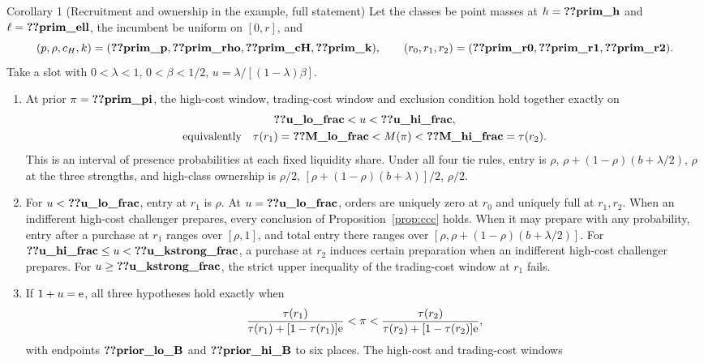 \begin{named}{Corollary 1 (Recruitment and ownership in the example, full statement)}
Let the classes be point masses at \(h=\reg{prim_h}\) and \(\ell=\reg{prim_ell}\), the incumbent be uniform on
\([0,r]\), and
\[
(p,\rho,c_H,k)=(\reg{prim_p},\reg{prim_rho},\reg{prim_cH},\reg{prim_k}),\qquad
(r_0,r_1,r_2)=(\reg{prim_r0},\reg{prim_r1},\reg{prim_r2}).
\]
Take a slot with \(0<\lambda<1\), \(0<\beta<1/2\), \(u=\lambda/[(1-\lambda)\beta]\).
\begin{enumerate}[label=(\alph*),leftmargin=2em]
\item At prior \(\pi=\reg{prim_pi}\), the high-cost window, trading-cost window and exclusion condition hold
together exactly on
\[
\begin{gathered}
\reg{u_lo_frac}<u<\reg{u_hi_frac},\\
\text{equivalently}\quad
\tau(r_1)=\reg{M_lo_frac}<M(\pi)<\reg{M_hi_frac}=\tau(r_2).
\end{gathered}
\]
This is an interval of presence probabilities at each fixed liquidity share. Under all four tie rules, entry is
\(\rho\), \(\rho+(1-\rho)(b+\lambda/2)\), \(\rho\) at the three strengths, and high-class ownership is
\(\rho/2\), \([\rho+(1-\rho)(b+\lambda)]/2\), \(\rho/2\).
\item For \(u<\reg{u_lo_frac}\), entry at \(r_1\) is \(\rho\). At \(u=\reg{u_lo_frac}\), orders are uniquely zero
at \(r_0\) and uniquely full at \(r_1,r_2\). When an indifferent high-cost challenger prepares, every conclusion
of Proposition~\ref{prop:ccc} holds. When it may prepare with any probability, entry after a purchase at \(r_1\)
ranges over \([\rho,1]\), and total entry there ranges over
\([\rho,\rho+(1-\rho)(b+\lambda/2)]\). For
\(\reg{u_hi_frac}\le u<\reg{u_kstrong_frac}\), a purchase at \(r_2\) induces certain preparation when an
indifferent high-cost challenger prepares. For \(u\ge\reg{u_kstrong_frac}\), the strict upper inequality of the
trading-cost window at \(r_1\) fails.
\item If \(1+u=\mathrm{e}\), all three hypotheses hold exactly when
\[
\frac{\tau(r_1)}{\tau(r_1)+[1-\tau(r_1)]\mathrm{e}}<\pi<
\frac{\tau(r_2)}{\tau(r_2)+[1-\tau(r_2)]\mathrm{e}},
\]
with endpoints \(\reg{prior_lo_B}\) and \(\reg{prior_hi_B}\) to six places. The high-cost and trading-cost windows

\end{enumerate}
\end{named}

